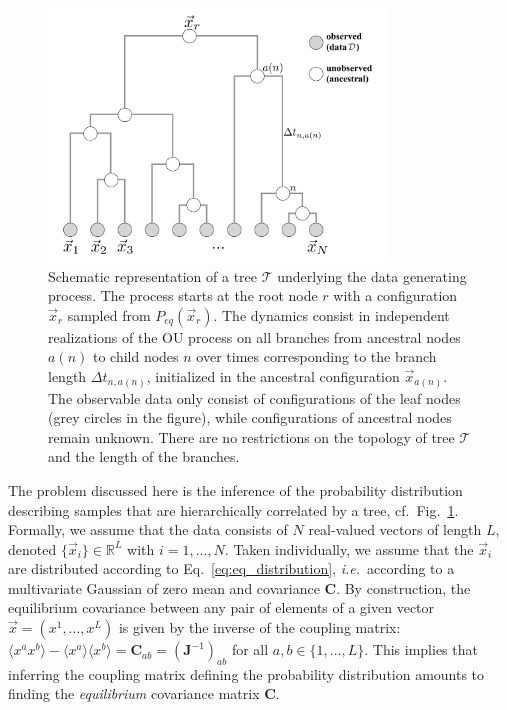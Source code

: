 \documentclass[preprint,amsmath,amssymb,superscriptaddress,showpacs,pre]{revtex4-1}
\newcommand{\ie}{\emph{i.e.}}
\def\vx{\vec x}
\begin{document}
\begin{figure}[!htb]
	\includegraphics[width=0.8\textwidth]{Figures/tree.pdf}
	\caption{Schematic representation of a tree $\mathcal{T}$ underlying the data generating process. The process starts at the root node $r$ with a configuration $\vx_r$ sampled from $P_{eq}(\vx_r)$. The dynamics consist in independent realizations of the OU process on all branches from ancestral nodes $a(n)$ to child nodes $n$ over times corresponding to the branch length $\Delta t_{n,a(n)}$, initialized in the ancestral configuration $\vx_{a(n)}$. The observable data only consist of configurations of the leaf nodes (grey circles in the figure), while configurations of ancestral nodes remain unknown. There are no restrictions on the topology of tree $\mathcal{T}$ and the length of the branches.}
	\label{fig:sample_tree}
\end{figure}


The problem discussed here is the inference of the probability distribution describing samples that are hierarchically correlated by a tree, cf.~Fig.~\ref{fig:sample_tree}. 
Formally, we assume that the data consists of $N$ real-valued vectors of length $L$, denoted $\{\vx_i\}\in\mathbb{R}^L$ with $i=1,...,N$. 
Taken individually, we assume that the $\vx_i$ are distributed according to Eq.~\eqref{eq:eq_distribution}, \ie~according to a multivariate Gaussian of zero mean and covariance $\bm C$.
By construction, the equilibrium covariance between any pair of elements of a given vector $\vx=(x^1,...,x^L)$ is given by the inverse of the coupling matrix: $\langle x^a x^b\rangle-\langle x^a\rangle\langle x^b\rangle = \bm C_{ab} = (\bm J^{-1})_{ab}$ for all $a,b\in\{1,...,L\}$. 
This implies that inferring the coupling matrix defining the probability distribution amounts to finding the \emph{equilibrium} covariance matrix $\mathbf{C}$.  
\end{document}
